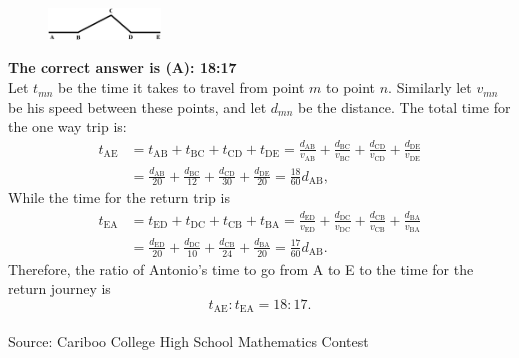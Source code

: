 \documentclass{article}
\begin{document}
\begin{figure}
	\includegraphics[width=30mm,viewport=11 234 533 389]{CCSPR74-19pic.eps}
\end{figure}

\textbf{The correct answer is (A): 18:17}\\[1 ex]
Let $t_{mn}$ be the time it takes to travel from point $m$ to point $n$. Similarly let $v_{mn}$ be his speed between these points, and let $d_{mn}$ be the distance. The total time for the one way trip is:
\begin{align*}
t_{\textrm{AE}}&=t_{\textrm{AB}}+t_{\textrm{BC}}+t_{\textrm{CD}}+t_{\textrm{DE}}=\frac{d_{\textrm{AB}}}{v_{\textrm{AB}}}+\frac{d_{\textrm{BC}}}{v_{\textrm{BC}}}+\frac{d_{\textrm{CD}}}{v_{\textrm{CD}}}+\frac{d_{\textrm{DE}}}{v_{\textrm{DE}}}\\
&=\frac{d_{\textrm{AB}}}{20}+\frac{d_{\textrm{BC}}}{12}+\frac{d_{\textrm{CD}}}{30}+\frac{d_{\textrm{DE}}}{20}=\frac{18}{60}d_{\textrm{AB}},
\end{align*}
While the time for the return trip is
\begin{align*}
t_{\textrm{EA}}&=t_{\textrm{ED}}+t_{\textrm{DC}}+t_{\textrm{CB}}+t_{\textrm{BA}}=\frac{d_{\textrm{ED}}}{v_{\textrm{ED}}}+\frac{d_{\textrm{DC}}}{v_{\textrm{DC}}}+\frac{d_{\textrm{CB}}}{v_{\textrm{CB}}}+\frac{d_{\textrm{BA}}}{v_{\textrm{BA}}}\\
&=\frac{d_{\textrm{ED}}}{20}+\frac{d_{\textrm{DC}}}{10}+\frac{d_{\textrm{CB}}}{24}+\frac{d_{\textrm{BA}}}{20}=\frac{17}{60}d_{\textrm{AB}}.
\end{align*}
Therefore, the ratio of Antonio's time to go from A to E to the time for the return journey is
\begin{equation*}
t_{\textrm{AE}}:t_{\textrm{EA}}=18:17.
\end{equation*}
\\[5 ex]

\scriptsize
Source: Cariboo College High School Mathematics Contest
\end{document}
